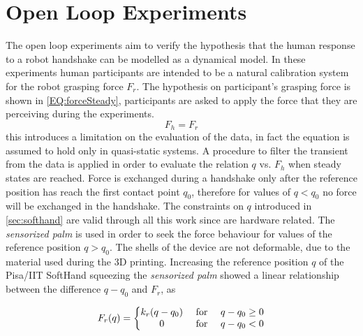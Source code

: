\chapter{Open Loop Experiments}
The open loop experiments aim to verify the hypothesis that the human response to a robot handshake can be modelled as a dynamical model. In these experiments human participants are intended to be a natural calibration system for the robot grasping force $F_r$. The hypothesis on participant's grasping force is shown in \ref{EQ:forceSteady}, participants are asked to apply the force that they are perceiving during the experiments.
\begin{equation}
F_{h} = F_{r}
\label{EQ:forceSteady}
\end{equation}
this introduces a limitation on the evaluation of the data, in fact the equation is assumed to hold only in quasi-static systems. A procedure to filter the transient from the data is applied in order to evaluate the relation $q$ vs. $F_h$ when steady states are reached.
Force is exchanged during a handshake only after the reference position has reach the first contact point $q_0$, therefore for values of $q < q_0$ no force will be exchanged in the handshake. The constraints on $q$ introduced in \ref{sec:softhand} are valid through all this work since are hardware related.
The \textit{sensorized palm} is used in order to seek the force behaviour for values of the reference position $q > q_0$. The shells of the device are not deformable, due to the material used during the 3D printing. Increasing the reference position $q$ of the Pisa/IIT SoftHand squeezing the \textit{sensorized palm} showed a linear relationship between the difference $q-q_0$ and $F_r$, as	 

\begin{equation}
F_{r}(q)=\left\{\begin{matrix}
k_{r}(q-q_0) & $ for $ &q-q_0 \geq 0 \\ 
0 & $ for $ & q-q_0 < 0
\end{matrix}\right.
\label{EQ:genericForce}
\end{equation}\\

%


